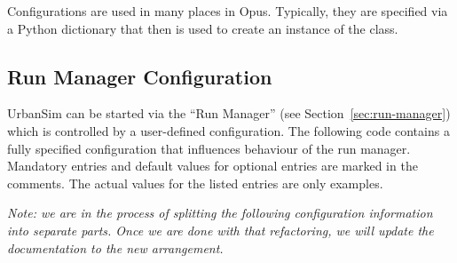 Configurations are used in many places in Opus.  Typically, they are specified
via a Python dictionary that then is used to create an instance of the
 class.

\subsection{Run Manager Configuration}
\label{sec:run-manager-configuration}
%

UrbanSim can be started via the ``Run Manager'' \runmanagerindex (see
Section~\ref{sec:run-manager}) which is controlled by a user-defined
configuration. The following code contains a fully specified configuration
that influences behaviour of the run manager. \runmanagerindex Mandatory entries and default
values for optional entries are marked in the comments. The actual values for
the listed entries are only examples.

\emph{Note: we are in the process of splitting the following configuration
information into separate parts.  Once we are done with that refactoring,
we will update the documentation to the new arrangement.}

